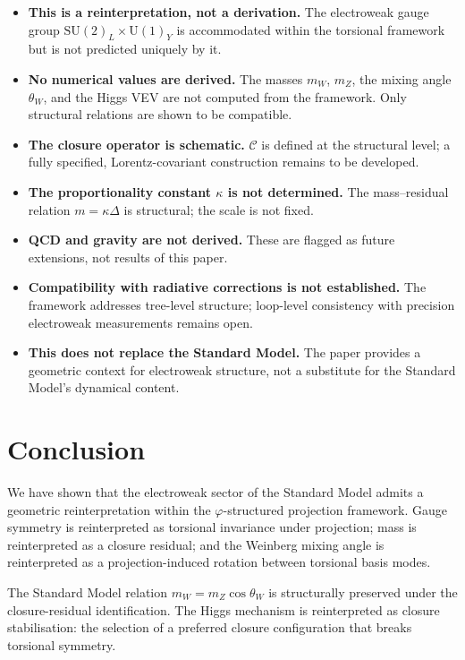 \documentclass[12pt]{article}
\newcommand{\Ccal}{\mathcal{C}}
\newcommand{\phig}{\varphi}
\begin{document}
\begin{itemize}
    \item \textbf{This is a reinterpretation, not a derivation.} The electroweak gauge group $\mathrm{SU}(2)_L \times \mathrm{U}(1)_Y$ is accommodated within the torsional framework but is not predicted uniquely by it.
    \item \textbf{No numerical values are derived.} The masses $m_W$, $m_Z$, the mixing angle $\theta_W$, and the Higgs VEV are not computed from the framework. Only structural relations are shown to be compatible.
    \item \textbf{The closure operator is schematic.} $\Ccal$ is defined at the structural level; a fully specified, Lorentz-covariant construction remains to be developed.
    \item \textbf{The proportionality constant $\kappa$ is not determined.} The mass--residual relation $m = \kappa\Delta$ is structural; the scale is not fixed.
    \item \textbf{QCD and gravity are not derived.} These are flagged as future extensions, not results of this paper.
    \item \textbf{Compatibility with radiative corrections is not established.} The framework addresses tree-level structure; loop-level consistency with precision electroweak measurements remains open.
    \item \textbf{This does not replace the Standard Model.} The paper provides a geometric context for electroweak structure, not a substitute for the Standard Model's dynamical content.
\end{itemize}

\section{Conclusion}\label{sec:conclusion}

We have shown that the electroweak sector of the Standard Model admits a geometric reinterpretation within the $\phig$-structured projection framework. Gauge symmetry is reinterpreted as torsional invariance under projection; mass is reinterpreted as a closure residual; and the Weinberg mixing angle is reinterpreted as a projection-induced rotation between torsional basis modes.

The Standard Model relation $m_W = m_Z \cos\theta_W$ is structurally preserved under the closure-residual identification. The Higgs mechanism is reinterpreted as closure stabilisation: the selection of a preferred closure configuration that breaks torsional symmetry.
\end{document}
